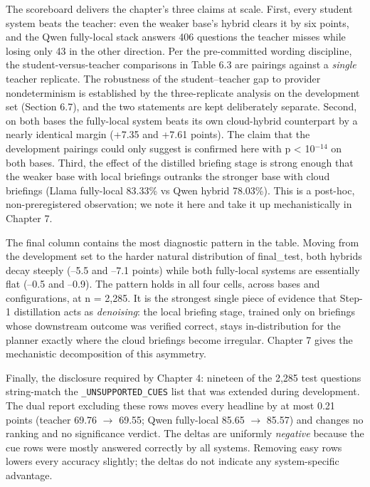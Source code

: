 The scoreboard delivers the chapter's three claims at scale. First, every student system beats
the teacher: even the weaker base's hybrid clears it by six points, and the Qwen fully-local
stack answers 406 questions the teacher misses while losing only 43 in the other direction.
Per the pre-committed wording discipline, the student-versus-teacher comparisons in Table 6.3
are pairings against a \emph{single} teacher replicate. The robustness of the student--teacher gap
to provider nondeterminism is established by the three-replicate analysis on the development
set (Section 6.7), and the two statements are kept deliberately separate. Second, on both
bases the fully-local system beats its own cloud-hybrid counterpart by a nearly identical
margin (+7.35 and +7.61 points). The claim that the development pairings could only suggest is
confirmed here with p < 10$^{-14}$ on both bases. Third, the effect of the distilled briefing stage
is strong enough that the weaker base with local briefings outranks the stronger base with
cloud briefings (Llama fully-local 83.33\% vs Qwen hybrid 78.03\%). This is a post-hoc,
non-preregistered observation; we note it here and take it up mechanistically in Chapter 7.

The final column contains the most diagnostic pattern in the table. Moving from the
development set to the harder natural distribution of final\_test, both hybrids decay steeply
(--5.5 and --7.1 points) while both fully-local systems are essentially flat (--0.5 and --0.9).
The pattern holds in all four cells, across bases and configurations, at n = 2,285. It is the
strongest single piece of evidence that Step-1 distillation acts as \emph{denoising}: the local
briefing stage, trained only on briefings whose downstream outcome was verified correct, stays
in-distribution for the planner exactly where the cloud briefings become irregular. Chapter 7
gives the mechanistic decomposition of this asymmetry.

Finally, the disclosure required by Chapter 4: nineteen of the 2,285 test questions
string-match the \texttt{\_UNSUPPORTED\_CUES} list that was extended during development. The dual
report excluding these rows moves every headline by at most 0.21 points (teacher 69.76 $\rightarrow$
69.55; Qwen fully-local 85.65 $\rightarrow$ 85.57) and changes no ranking and no significance verdict.
The deltas are uniformly \emph{negative} because the cue rows were mostly answered correctly by all
systems. Removing easy rows lowers every accuracy slightly; the deltas do not indicate any
system-specific advantage.

